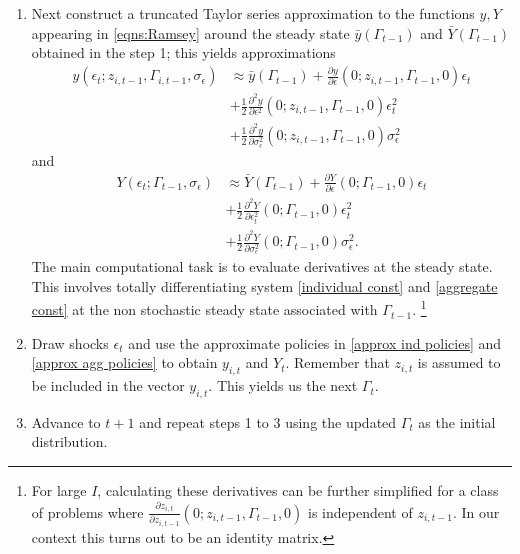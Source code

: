 \documentclass[thmsb,11pt]{article}
\begin{document}
\begin{enumerate}
	
	\item Next construct a truncated Taylor series approximation to the functions $y, Y$ appearing in \eqref{eqns:Ramsey} around the steady state $\bar{y}(\Gamma_{t-1})$ and $\bar{Y}(\Gamma_{t-1})$ obtained in the step 1; this yields   approximations
	\begin{align}\label{approx ind policies}
y(\epsilon_t;z_{i,t-1},\Gamma_{i,t-1},\sigma_\epsilon) &\approx \bar{y}(\Gamma_{t-1})+ \frac{\partial y}{\partial \epsilon}(0;z_{i,t-1},\Gamma_{t-1},0) \epsilon_t\\\nonumber
					&+  \frac{1}{2}\frac{\partial^2 y}{\partial \epsilon^2}(0;z_{i,t-1},\Gamma_{t-1},0)\epsilon_t^2\\ \nonumber
					&+ \frac{1}{2}\frac{\partial^2 y}{\partial \sigma_{\epsilon}^2}(0;z_{i,t-1},\Gamma_{t-1},0) \sigma_{\epsilon}^2
\end{align}and
\begin{align}\label{approx agg policies}			
Y(\epsilon_t;\Gamma_{t-1},\sigma_{\epsilon}) &\approx \bar{Y}(\Gamma_{t-1})+ \frac{\partial Y}{\partial \epsilon}(0;\Gamma_{t-1},0) \epsilon_t\\\nonumber
	&+  \frac{1}{2}\frac{\partial^2 Y}{\partial \epsilon_t^2}(0;\Gamma_{t-1},0)\epsilon^2_t\\
					&+ \frac{1}{2}\frac{\partial^2 Y}{\partial \sigma_{\epsilon}^2}(0;\Gamma_{t-1},0)\sigma_{\epsilon}^2. \nonumber
\end{align}	
	The main computational task is to evaluate derivatives at the steady state.  This involves  totally  differentiating
 system \eqref{individual const} and \eqref{aggregate const} at the non stochastic steady state associated with $\Gamma_{t-1}$. \footnote{For large $I$, calculating these derivatives can be further simplified for a class of problems where $\frac{\partial z_{i,t}}{\partial z_{i,t-1}}(0;z_{i,t-1},\Gamma_{t-1},0)$ is independent of $z_{i,t-1}$. In our context this turns out to be an identity matrix.}

\item Draw shocks $\epsilon_t$ and use the approximate policies in \eqref{approx ind policies} and \eqref{approx agg policies} to obtain $y_{i,t}$ and $Y_{t}$. Remember that $z_{i,t}$ is assumed to be included in the vector $y_{i,t}$.  This yields us the next $\Gamma_t$.
\item Advance to $t+1$ and repeat steps 1 to 3 using the updated $\Gamma_{t}$ as the initial distribution.
\end{enumerate}
\end{document}
